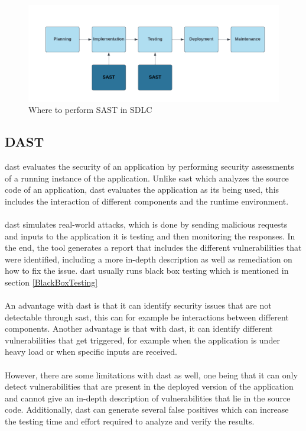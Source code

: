\vspace{2mm}
\begin{figure}[H]
    \centering
    \includegraphics[width=0.8\columnwidth]{Images/sast.png}
    \caption{Where to perform SAST in SDLC}
    \label{fig: Performance of SAST in SDLC}
\end{figure}


\subsection{DAST}
\acrlong{dast} evaluates the security of an application by performing security assessments of a running instance of the application. Unlike \acrshort{sast} which analyzes the source code of an application, \acrshort{dast} evaluates the application as its being used, this includes the interaction of different components and the runtime environment. 
\\~\\
\acrshort{dast} simulates real-world attacks, which is done by sending malicious requests and inputs to the application it is testing and then monitoring the responses. In the end, the tool generates a report that includes the different vulnerabilities that were identified, including a more in-depth description as well as remediation on how to fix the issue. 
\acrshort{dast} usually runs black box testing  which is mentioned in section \ref{BlackBoxTesting} \cite{dast}
\\~\\
An advantage with \acrshort{dast} is that it can identify security issues that are not detectable through \acrshort{sast}, this can for example be interactions between different components. Another advantage is that with \acrshort{dast}, it can identify different vulnerabilities that get triggered, for example when the application is under heavy load or when specific inputs are received.
\\~\\
However, there are some limitations with \acrshort{dast} as well, one being that it can only detect vulnerabilities that are present in the deployed version of the application and cannot give an in-depth description of vulnerabilities that lie in the source code. Additionally, \acrshort{dast} can generate several false positives which can increase the testing time and effort required to analyze and verify the results. 
